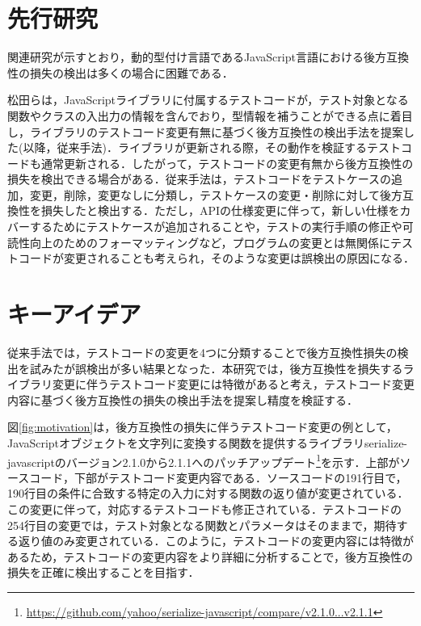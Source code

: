 \documentclass[11pt,dvipdfmx]{jreport}
\begin{document}
\section{先行研究}
関連研究が示すとおり，動的型付け言語であるJavaScript言語における後方互換性の損失の検出は多くの場合に困難である．

松田らは，JavaScriptライブラリに付属するテストコードが，テスト対象となる関数やクラスの入出力の情報を含んでおり，型情報を補うことができる点に着目し，ライブラリのテストコード変更有無に基づく後方互換性の検出手法を提案した\cite{matsuda}(以降，従来手法)．ライブラリが更新される際，その動作を検証するテストコードも通常更新される．したがって，テストコードの変更有無から後方互換性の損失を検出できる場合がある．従来手法は，テストコードをテストケースの追加，変更，削除，変更なしに分類し，テストケースの変更・削除に対して後方互換性を損失したと検出する．ただし，APIの仕様変更に伴って，新しい仕様をカバーするためにテストケースが追加されることや，テストの実行手順の修正や可読性向上のためのフォーマッティングなど，プログラムの変更とは無関係にテストコードが変更されることも考えられ，そのような変更は誤検出の原因になる．

\section{キーアイデア}\label{sec:key-idea}
従来手法では，テストコードの変更を4つに分類することで後方互換性損失の検出を試みたが誤検出が多い結果となった．本研究では，後方互換性を損失するライブラリ変更に伴うテストコード変更には特徴があると考え，テストコード変更内容に基づく後方互換性の損失の検出手法を提案し精度を検証する．

図\ref{fig:motivation}は，後方互換性の損失に伴うテストコード変更の例として，JavaScriptオブジェクトを文字列に変換する関数を提供するライブラリserialize-javascriptのバージョン2.1.0から2.1.1へのパッチアップデート\footnote{\url{https://github.com/yahoo/serialize-javascript/compare/v2.1.0...v2.1.1}}を示す．上部がソースコード，下部がテストコード変更内容である．ソースコードの191行目で，190行目の条件に合致する特定の入力に対する関数の返り値が変更されている．この変更に伴って，対応するテストコードも修正されている．テストコードの254行目の変更では，テスト対象となる関数とパラメータはそのままで，期待する返り値のみ変更されている．このように，テストコードの変更内容には特徴があるため，テストコードの変更内容をより詳細に分析することで，後方互換性の損失を正確に検出することを目指す．
\end{document}
